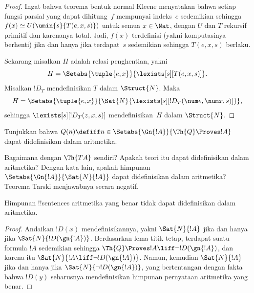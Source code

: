 \documentclass[../../../include/open-logic-section]{subfiles}
\begin{document}
\begin{proof}
Ingat bahwa teorema bentuk normal Kleene menyatakan bahwa setiap fungsi
parsial yang dapat dihitung~$f$ mempunyai indeks~$e$ sedemikian sehingga
$f(x) \simeq U(\umin{s}{T(e,x,s)})$ untuk semua $x \in \Nat$, dengan $U$
dan $T$ rekursif primitif dan karenanya total. Jadi, $f(x)$ terdefinisi
(yakni komputasinya berhenti) jika dan hanya jika terdapat~$s$ sedemikian
sehingga $T(e,x,s)$ berlaku.

Sekarang misalkan $H$ adalah relasi penghentian, yakni
\[
H = \Setabs{\tuple{e,x}}{\lexists[s][T(e, x, s)]}.
\]
Misalkan $!D_T$ mendefinisikan $T$ dalam $\Struct{N}$. Maka
\[
H = \Setabs{\tuple{e,x}}{\Sat{N}{\lexists[s][!D_T(\num e, \num x, s)]}},
\]
sehingga $\lexists[s][!D_T(z, x, s)]$ mendefinisikan~$H$ dalam
$\Struct{N}$.
\end{proof}

\begin{prob}
Tunjukkan bahwa $Q(n) \defiff n \in
\Setabs{\Gn{!A}}{\Th{Q} \Proves !A}$ dapat didefinisikan dalam aritmetika.
\end{prob}

Bagaimana dengan $\Th{TA}$ sendiri? Apakah teori itu dapat didefinisikan
dalam aritmetika? Dengan kata lain, apakah himpunan
$\Setabs{\Gn{!A}}{\Sat{N}{!A}}$ dapat didefinisikan dalam aritmetika?
Teorema Tarski menjawabnya secara negatif.

\begin{thm}
Himpunan !!{sentence}s aritmetika yang benar tidak dapat didefinisikan dalam
aritmetika.
\end{thm}

\begin{proof}
Andaikan $!D(x)$ mendefinisikannya, yakni $\Sat{N}{!A}$ jika dan hanya jika
$\Sat{N}{!D(\gn{!A})}$. Berdasarkan lema titik tetap, terdapat suatu formula
$!A$ sedemikian sehingga
$\Th{Q} \Proves !A \liff \lnot !D(\gn{!A})$, dan karena itu
$\Sat{N}{!A \liff \lnot !D(\gn{!A})}$. Namun, kemudian $\Sat{N}{!A}$ jika
dan hanya jika $\Sat{N}{\lnot !D(\gn{!A})}$, yang bertentangan dengan fakta
bahwa $!D(y)$ seharusnya mendefinisikan himpunan pernyataan aritmetika yang
benar.
\end{proof}
\end{document}
